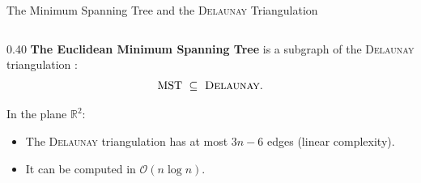 \documentclass[A4,svgnames,9pt,aspectratio=169]{beamer}
\begin{document}
\begin{frame}{The Minimum Spanning Tree and the \textnormal{\textsc{Delaunay}} Triangulation}
\begin{columns}[c, onlytextwidth]
        \begin{column}{0.40\textwidth}
            \textbf{The Euclidean Minimum Spanning Tree} is a subgraph of the \textnormal{\textsc{Delaunay}} triangulation \cite{BoissonnatChazalYvinec}:
            \[
                \mathrm{MST} \ \subseteq \ \text{\textsc{Delaunay}}.
            \]
            
            \vspace{0.8cm}
            
            In the plane $\mathbb{R}^2$:
            \begin{itemize}
                \setlength{\itemsep}{8pt}
                \item The \textnormal{\textsc{Delaunay}} triangulation has at most $3n-6$ edges (linear complexity).
                \item It can be computed in $\mathcal{O}(n \log n)$.
            \end{itemize}
        \end{column}
    \end{columns}
\end{frame}
\end{document}
